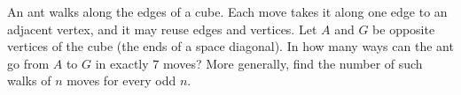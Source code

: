 An ant walks along the edges of a cube. Each move takes it along one edge to an adjacent vertex, and it may reuse edges and vertices. Let $A$ and $G$ be opposite vertices of the cube (the ends of a space diagonal). In how many ways can the ant go from $A$ to $G$ in exactly $7$ moves? More generally, find the number of such walks of $n$ moves for every odd $n$.
